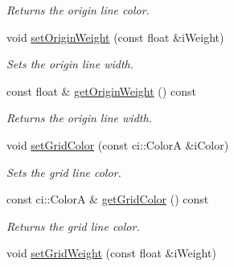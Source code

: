 \begin{DoxyCompactItemize}
\begin{DoxyCompactList}\small\item\em Returns the origin line color. \end{DoxyCompactList}\item 
\hypertarget{class_gui_plot_a67df433b9f22adf9bdadecb6a5b685b0}{void \hyperlink{class_gui_plot_a67df433b9f22adf9bdadecb6a5b685b0}{set\-Origin\-Weight} (const float \&i\-Weight)}\label{class_gui_plot_a67df433b9f22adf9bdadecb6a5b685b0}

\begin{DoxyCompactList}\small\item\em Sets the origin line width. \end{DoxyCompactList}\item 
\hypertarget{class_gui_plot_aab5051cf6575fbe38bf9e326f9ce9780}{const float \& \hyperlink{class_gui_plot_aab5051cf6575fbe38bf9e326f9ce9780}{get\-Origin\-Weight} () const }\label{class_gui_plot_aab5051cf6575fbe38bf9e326f9ce9780}

\begin{DoxyCompactList}\small\item\em Returns the origin line width. \end{DoxyCompactList}\item 
\hypertarget{class_gui_plot_aa52f853cd41fd11e9c9927c7cff2c2ee}{void \hyperlink{class_gui_plot_aa52f853cd41fd11e9c9927c7cff2c2ee}{set\-Grid\-Color} (const ci\-::\-Color\-A \&i\-Color)}\label{class_gui_plot_aa52f853cd41fd11e9c9927c7cff2c2ee}

\begin{DoxyCompactList}\small\item\em Sets the grid line color. \end{DoxyCompactList}\item 
\hypertarget{class_gui_plot_a471ad0596b9f4e9bc57c68704343771f}{const ci\-::\-Color\-A \& \hyperlink{class_gui_plot_a471ad0596b9f4e9bc57c68704343771f}{get\-Grid\-Color} () const }\label{class_gui_plot_a471ad0596b9f4e9bc57c68704343771f}

\begin{DoxyCompactList}\small\item\em Returns the grid line color. \end{DoxyCompactList}\item 
\hypertarget{class_gui_plot_a6e7eb87c0794a5ab3b86aa8b316a0818}{void \hyperlink{class_gui_plot_a6e7eb87c0794a5ab3b86aa8b316a0818}{set\-Grid\-Weight} (const float \&i\-Weight)}\label{class_gui_plot_a6e7eb87c0794a5ab3b86aa8b316a0818}


\end{DoxyCompactItemize}
